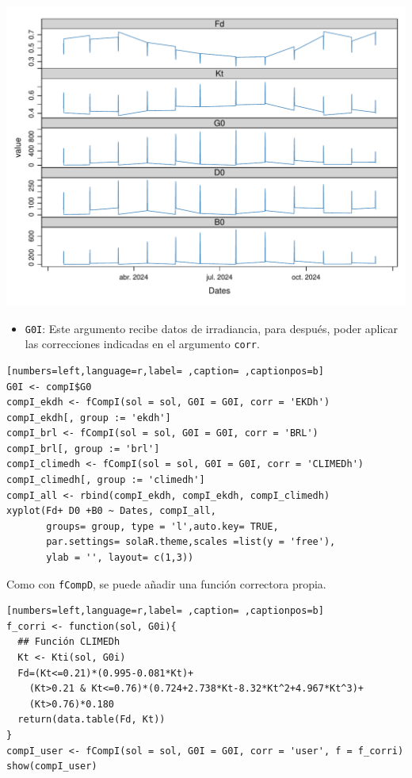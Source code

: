 \begin{itemize}
\begin{center}
\includegraphics[width=\textwidth]{figuras/codigo-fcompicompd.pdf}
\end{center}
\begin{itemize}
\item \texttt{G0I}: Este argumento recibe datos de irradiancia, para después, poder aplicar las correcciones indicadas en el argumento \texttt{corr}.
\end{itemize}
\begin{lstlisting}[numbers=left,language=r,label= ,caption= ,captionpos=b]
G0I <- compI$G0
compI_ekdh <- fCompI(sol = sol, G0I = G0I, corr = 'EKDh')
compI_ekdh[, group := 'ekdh']
compI_brl <- fCompI(sol = sol, G0I = G0I, corr = 'BRL')
compI_brl[, group := 'brl']
compI_climedh <- fCompI(sol = sol, G0I = G0I, corr = 'CLIMEDh')
compI_climedh[, group := 'climedh']
compI_all <- rbind(compI_ekdh, compI_ekdh, compI_climedh)
xyplot(Fd+ D0 +B0 ~ Dates, compI_all,
       groups= group, type = 'l',auto.key= TRUE,
       par.settings= solaR.theme,scales =list(y = 'free'),
       ylab = '', layout= c(1,3))
\end{lstlisting}

Como con \texttt{fCompD}, se puede añadir una función correctora propia.
\begin{lstlisting}[numbers=left,language=r,label= ,caption= ,captionpos=b]
f_corri <- function(sol, G0i){
  ## Función CLIMEDh
  Kt <- Kti(sol, G0i)
  Fd=(Kt<=0.21)*(0.995-0.081*Kt)+
    (Kt>0.21 & Kt<=0.76)*(0.724+2.738*Kt-8.32*Kt^2+4.967*Kt^3)+
    (Kt>0.76)*0.180
  return(data.table(Fd, Kt))
}
compI_user <- fCompI(sol = sol, G0I = G0I, corr = 'user', f = f_corri)
show(compI_user)
\end{lstlisting}


\end{itemize}
